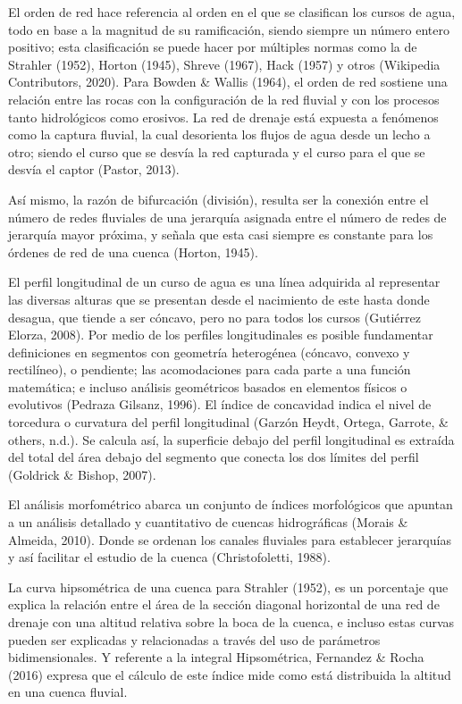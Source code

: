 \documentclass[11pt,]{article}
\begin{document}
El orden de red hace referencia al orden en el que se clasifican los
cursos de agua, todo en base a la magnitud de su ramificación, siendo
siempre un número entero positivo; esta clasificación se puede hacer por
múltiples normas como la de Strahler (1952), Horton (1945), Shreve
(1967), Hack (1957) y otros (Wikipedia Contributors, 2020). Para Bowden
\& Wallis (1964), el orden de red sostiene una relación entre las rocas
con la configuración de la red fluvial y con los procesos tanto
hidrológicos como erosivos. La red de drenaje está expuesta a fenómenos
como la captura fluvial, la cual desorienta los flujos de agua desde un
lecho a otro; siendo el curso que se desvía la red capturada y el curso
para el que se desvía el captor (Pastor, 2013).

Así mismo, la razón de bifurcación (división), resulta ser la conexión
entre el número de redes fluviales de una jerarquía asignada entre el
número de redes de jerarquía mayor próxima, y señala que esta casi
siempre es constante para los órdenes de red de una cuenca (Horton,
1945).

El perfil longitudinal de un curso de agua es una línea adquirida al
representar las diversas alturas que se presentan desde el nacimiento de
este hasta donde desagua, que tiende a ser cóncavo, pero no para todos
los cursos (Gutiérrez Elorza, 2008). Por medio de los perfiles
longitudinales es posible fundamentar definiciones en segmentos con
geometría heterogénea (cóncavo, convexo y rectilíneo), o pendiente; las
acomodaciones para cada parte a una función matemática; e incluso
análisis geométricos basados en elementos físicos o evolutivos (Pedraza
Gilsanz, 1996). El índice de concavidad indica el nivel de torcedura o
curvatura del perfil longitudinal (Garzón Heydt, Ortega, Garrote, \&
others, n.d.). Se calcula así, la superficie debajo del perfil
longitudinal es extraída del total del área debajo del segmento que
conecta los dos límites del perfil (Goldrick \& Bishop, 2007).

El análisis morfométrico abarca un conjunto de índices morfológicos que
apuntan a un análisis detallado y cuantitativo de cuencas hidrográficas
(Morais \& Almeida, 2010). Donde se ordenan los canales fluviales para
establecer jerarquías y así facilitar el estudio de la cuenca
(Christofoletti, 1988).

La curva hipsométrica de una cuenca para Strahler (1952), es un
porcentaje que explica la relación entre el área de la sección diagonal
horizontal de una red de drenaje con una altitud relativa sobre la boca
de la cuenca, e incluso estas curvas pueden ser explicadas y
relacionadas a través del uso de parámetros bidimensionales. Y referente
a la integral Hipsométrica, Fernandez \& Rocha (2016) expresa que el
cálculo de este índice mide como está distribuida la altitud en una
cuenca fluvial.
\end{document}
